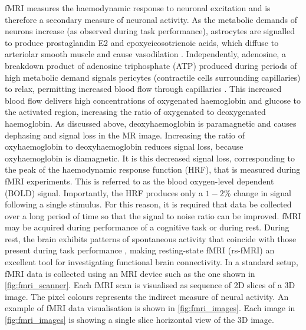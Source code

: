 fMRI measures the haemodynamic response to neuronal excitation and is therefore a secondary measure of neuronal activity. As the metabolic demands of neurons increase (as observed during task performance), astrocytes are signalled to produce prostaglandin E2 and epoxyeicosotrienoic acids, which diffuse to arteriolar smooth muscle and cause vasodilation \citep{hamilton2010pericyte}. Independently, adenosine, a breakdown product of adenosine triphosphate (ATP) produced during periods of high metabolic demand signals pericytes (contractile cells surrounding capillaries) to relax, permitting increased blood flow through capillaries \citep{hamilton2010pericyte}. This increased blood flow delivers high concentrations of oxygenated haemoglobin and glucose to the activated region, increasing the ratio of oxygenated to deoxygenated haemoglobin. As discussed above, deoxyhaemoglobin is paramagnetic and causes dephasing and signal loss in the MR image. Increasing the ratio of oxyhaemoglobin to deoxyhaemoglobin reduces signal loss, because oxyhaemoglobin is diamagnetic. It is this decreased signal loss, corresponding to the peak of the haemodynamic response function (HRF), that is measured during fMRI experiments. This is referred to as the blood oxygen-level dependent (BOLD) signal. Importantly, the HRF produces
only a $1-2\%$ change in signal following a single stimulus. For this reason, it is required that data be collected over a long period of time so that the signal to noise ratio can be improved.
fMRI may be acquired during performance of a cognitive task or during rest. During rest, the brain exhibits patterns of spontaneous activity that coincide with those present during task performance \citep{smith2009correspondence}, making resting-state fMRI (rs-fMRI) an excellent tool for investigating functional brain connectivity. In a standard setup, fMRI data is collected using an MRI device such as the one shown in \figurename \ref{fig:fmri_scanner}. Each fMRI scan is visualised as sequence of 2D slices of a 3D image. The pixel colours represents the indirect measure of neural activity. An example of fMRI data visualisation is shown in \figurename \ref{fig:fmri_images}. Each image in \figurename \ref{fig:fmri_images} is showing a single slice horizontal view of the 3D image.

